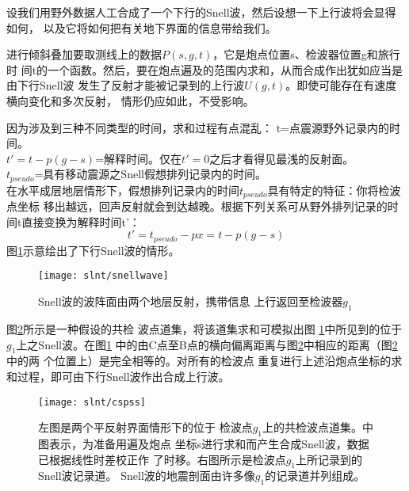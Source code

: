 设我们用野外数据人工合成了一个下行的Snell波，然后设想一下上行波将会显得如何，
以及它将如何把有关地下界面的信息带给我们。

进行倾斜叠加要取测线上的数据$P(s,g,t)$，它是炮点位置s、检波器位置g和旅行时
间t的一个函数。然后，要在炮点遍及的范围内求和，从而合成作出犹如应当是由下行Snell波
发生了反射才能被记录到的上行波$U(g,t)$。即使可能存在有速度横向变化和多次反射，
情形仍应如此，不受影响。

因为涉及到三种不同类型的时间，求和过程有点混乱：
t=点震源野外记录内的时间。\\
$t'=t-p(g-s)$=解释时间。仅在$t'=0$之后才看得见最浅的反射面。\\
$t_{pseudo}$=具有移动震源之Snell假想排列记录内的时间。\\

在水平成层地层情形下，假想排列记录内的时间$t_{pseudo}$具有特定的特征：你将检波点坐标
移出越远，回声反射就会到达越晚。根据下列关系可从野外排列记录的时间t直接变换为解释时间t'：
\begin{equation}
t'=t_{pseudo}-px=t-p(g-s)
\label{eq:ex5.3.1}
\end{equation}
图\ref{fig:slnt/snellwave}示意绘出了下行Snell波的情形。

\begin{figure}[H]
\centering
\texttt{[image: slnt/snellwave]}
\caption[snellwave]{Snell波的波阵面由两个地层反射，携带信息
上行返回至检波器$g_1$
}
\label{fig:slnt/snellwave}
\end{figure}

图\ref{fig:slnt/cspss}所示是一种假设的共检
波点道集，将该道集求和可模拟出图
\ref{fig:slnt/snellwave}中所见到的位于$g_1$上之Snell波。在图\ref{fig:slnt/snellwave}
中的由C点至B点的横向偏离距离与图\ref{fig:slnt/cspss}中相应的距离（图\ref{fig:slnt/cspss}中的两
个位置上）是完全相等的。对所有的检波点
重复进行上述沿炮点坐标的求和过程，即可由下行Snell波作出合成上行波。

\begin{figure}[H]
\centering
\texttt{[image: slnt/cspss]}
\caption[cspss]{左图是两个平反射界面情形下的位于
检波点$g_1$上的共检波点道集。中图表示，为准备用遍及炮点
坐标s进行求和而产生合成Snell波，数据已根据线性时差校正作
了时移。右图所示是检波点$g_1$上所记录到的Snell波记录道。
Snell波的地震剖面由许多像$g_1$的记录道并列组成。
}
\label{fig:slnt/cspss}
\end{figure}


